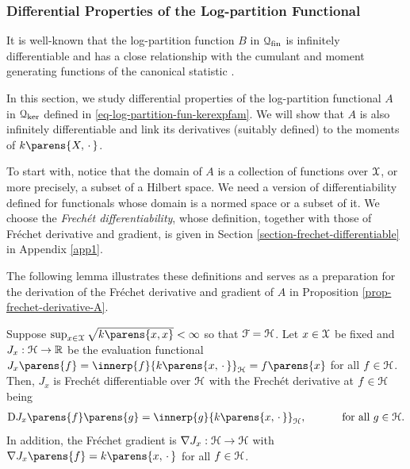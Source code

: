 \subsubsection{Differential Properties of the Log-partition Functional}

It is well-known that the log-partition function $B$ in $\mathcal{Q}_{\mathrm{fin}}$ is infinitely differentiable and has a close relationship with the cumulant and moment generating functions of the canonical statistic \parencites[Theorem 2.2 in][]{Brown1986-ef}. 

In this section, we study differential properties of the log-partition functional $A$ in $\mathcal{Q}_{\ker}$ defined in \eqref{eq-log-partition-fun-kerexpfam}. We will show that $A$ is also infinitely differentiable and link its derivatives (suitably defined) to the moments of $k \parens{X, \,\cdot\,}$. 

To start with, notice that the domain of $A$ is a collection of functions over $\mathcal{X}$, or more precisely, a subset of a Hilbert space. We need a version of differentiability defined for functionals whose domain is a normed space or a subset of it. We choose the \textit{Frech{\'e}t differentiability}, whose definition, together with those of Fr{\'e}chet derivative and gradient, is given in Section \ref{section-frechet-differentiable} in Appendix \ref{app1}. 

The following lemma illustrates these definitions and serves as a preparation for the derivation of the Fr{\'e}chet derivative and gradient of $A$ in Proposition \ref{prop-frechet-derivative-A}. 

\begin{lemma}\label{lemma-eval-functional-frechet-diff}
	Suppose $\sup_{x \in \calX} \sqrt{k \parens{x, x}} < \infty$ so that $\mathcal{F} = \mathcal{H}$. Let $x \in \mathcal{X}$ be fixed and $J_x: \mathcal{H} \to \mathbb{R}$ be the evaluation functional $J_x \parens{f} = \innerp{f}{k \parens{x, \,\cdot\,}}_{\calH} = f \parens{x}$ for all $f \in \mathcal{H}$. Then, $J_x$ is Frech{\'e}t differentiable over $\mathcal{H}$ with the Frech{\'e}t derivative at $f \in \mathcal{H}$ being 
	\begin{align*}
		\Diff J_x \parens{f} \parens{g} = \innerp{g}{k \parens{x, \,\cdot\,}}_{\calH}, \quad \qquad \text{ for all } g \in \calH. 
	\end{align*}
	In addition, the Fr{\'e}chet gradient is $\nabla J_x: \mathcal{H} \to \mathcal{H}$ with $\nabla J_x \parens{f} = k \parens{x, \,\cdot\,}$ for all $f \in \mathcal{H}$. 
\end{lemma}

